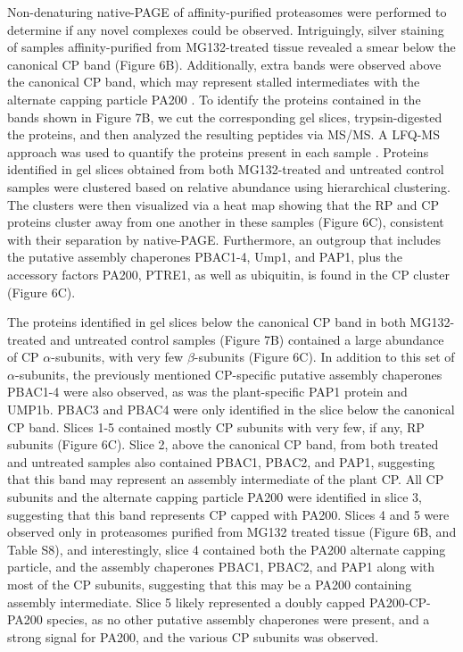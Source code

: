 Non-denaturing native-PAGE of affinity-purified proteasomes were performed to determine if any novel complexes could be observed. Intriguingly, silver staining of samples affinity-purified from MG132-treated tissue revealed a smear below the canonical CP band (Figure 6B). Additionally, extra bands were observed above the canonical CP band, which may represent stalled intermediates with the alternate capping particle PA200 \citep{li07}. To identify the proteins contained in the bands shown in Figure 7B, we cut the corresponding gel slices, trypsin-digested the proteins, and then analyzed the resulting peptides via MS/MS. A LFQ-MS approach was used to quantify the proteins present in each sample \citep{gemperline16}. Proteins identified in gel slices obtained from both MG132-treated and untreated control samples were clustered based on relative abundance using hierarchical clustering. The clusters were then visualized via a heat map showing that the RP and CP proteins cluster away from one another in these samples (Figure 6C), consistent with their separation by native-PAGE. Furthermore, an outgroup that includes the putative assembly chaperones PBAC1-4, Ump1, and PAP1, plus the accessory factors PA200, PTRE1, as well as ubiquitin, is found in the CP cluster (Figure 6C).

The proteins identified in gel slices below the canonical CP band in both MG132-treated and untreated control samples (Figure 7B) contained a large abundance of CP $\alpha$-subunits, with very few $\beta$-subunits (Figure 6C). In addition to this set of $\alpha$-subunits, the previously mentioned CP-specific putative assembly chaperones PBAC1-4 were also observed, as was the plant-specific PAP1 protein and UMP1b. PBAC3 and PBAC4 were only identified in the slice below the canonical CP band. Slices 1-5 contained mostly CP subunits with very few, if any, RP subunits (Figure 6C). Slice 2, above the canonical CP band, from both treated and untreated samples also contained PBAC1, PBAC2, and PAP1, suggesting that this band may represent an assembly intermediate of the plant CP. All CP subunits and the alternate capping particle PA200 were identified in slice 3, suggesting that this band represents CP capped with PA200. Slices 4 and 5 were observed only in proteasomes purified from MG132 treated tissue (Figure 6B, and Table S8), and interestingly, slice 4 contained both the PA200 alternate capping particle, and the assembly chaperones PBAC1, PBAC2, and PAP1 along with most of the CP subunits, suggesting that this may be a PA200 containing assembly intermediate. Slice 5 likely represented a doubly capped PA200-CP-PA200 species, as no other putative assembly chaperones were present, and a strong signal for PA200, and the various CP subunits was observed. 


